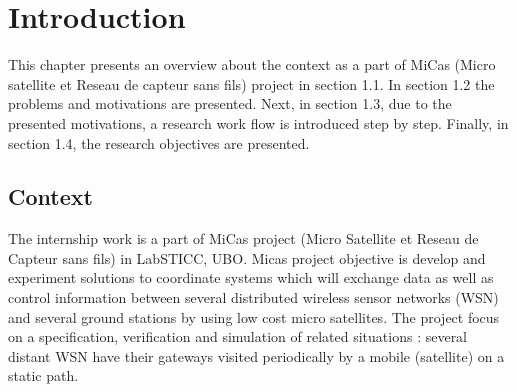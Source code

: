 \chapter{Introduction}
\label{introchap}

This chapter presents an overview about the context as a part of MiCas (Micro satellite
et Reseau de capteur sans fils) project in section 1.1. In section 1.2 the problems and
motivations are presented. Next, in section 1.3, due to the presented motivations, a
research work flow is introduced step by step. Finally, in section 1.4, the research
objectives are presented.

\section{Context}
The internship work is a part of MiCas project (Micro Satellite et Reseau de Capteur sans fils)
in LabSTICC, UBO. Micas project objective is develop and experiment solutions to coordinate
systems which will exchange data as well as control information between several distributed wireless
sensor networks (WSN) and several ground stations by using low cost micro satellites. The project
focus on a specification, verification and simulation of related situations : several distant WSN
have their gateways visited periodically by a mobile (satellite) on a static path.

